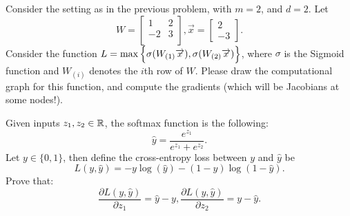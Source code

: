 \documentclass[11pt]{article}
\newenvironment{problem}[2][Problem]{\begin{trivlist}
\item[\hskip \labelsep {\bfseries #1}\hskip \labelsep {\bfseries #2.}]}{\end{trivlist}}
\begin{document}
\begin{problem}{2. (10 points)}
Consider the setting as in the previous problem, with $m=2$, and $d=2$. Let
\[
W = \begin{bmatrix}
    1 & 2 \\
    -2 & 3   \\
\end{bmatrix},
\overrightarrow x = \begin{bmatrix}
2\\
-3
\end{bmatrix}.
\]
Consider the function $L = \max\Big \{\sigma \small(W_{(1)} \overrightarrow x\small), \sigma \small(W_{(2)} \overrightarrow x \small)\Big\}$, where $\sigma$ is the Sigmoid function and $W_{(i)}$ denotes the $i$th row of $W$. Please draw the computational graph for this function, and compute the gradients (which will be Jacobians at some nodes!).
\end{problem}


\begin{problem}{3. (10 points)}
	Given inputs $z_1, z_2\in \mathbb{R}$, the softmax function is the following:
	\[
		\hat{y} = \frac{e^{z_1}}{e^{z_1} + e^{z_2}}.
	\]
	Let $y \in \{0, 1\}$, then define the cross-entropy loss between $y$ and $\hat{y}$ be
	\[
		L(y, \hat{y}) = -y\log(\hat{y}) - (1-y)\log(1-\hat{y}).
	\]
	Prove that:
	\[
		\frac{\partial L(y,\hat{y})}{\partial z_1} = \hat{y} - y, \frac{\partial L(y,\hat{y})}{\partial z_2} = y - \hat{y}.
	\]
\end{problem}
\end{document}

